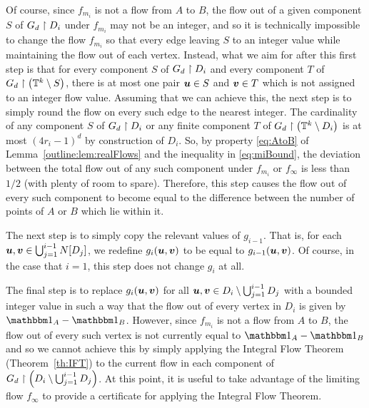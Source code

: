 \documentclass[12pt,a4paper]{amsart}
\numberwithin{equation}{section}
\theoremstyle{definition}
\begin{document}
Of course, since $f_{m_i}$ is not a flow from $A$ to $B$, the flow out of a given component $S$ of $G_d\upharpoonright D_i$ under $f_{m_i}$ may not be an integer, and so it is technically impossible to change the flow $f_{m_i}$ so that every edge leaving $S$ to an integer value while maintaining the flow out of each vertex. Instead, what we aim for after this first step is that for every component $S$ of $G_d\upharpoonright D_i$ and every component $T$ of $G_d\upharpoonright \left(\mathbb{T}^k\setminus S\right)$, there is at most one pair $\boldsymbol{u}\in S$ and $\boldsymbol{v}\in T$ which is not assigned to an integer flow value. Assuming that we can achieve this, the next step is to simply round the flow on every such edge to the nearest integer. The cardinality of any component $S$ of $G_d\upharpoonright D_i$ or any finite component $T$ of $G_d\upharpoonright \left(\mathbb{T}^k\setminus D_i\right)$ is at most $(4r_i-1)^d$ by construction of $D_i$. So, by property \eqref{eq:AtoB} of Lemma~\ref{outline:lem:realFlows} and the inequality in \eqref{eq:miBound}, the deviation between the total flow out of any such component under $f_{m_i}$ or $f_\infty$ is less than $1/2$ (with plenty of room to spare). Therefore, this step causes the flow out of every such component to become equal to the difference between the number of points of $A$ or $B$ which lie within it.

The next step is to simply copy the relevant values of $g_{i-1}$. That is, for each $\boldsymbol{u},\boldsymbol{v}\in \bigcup_{j=1}^{i-1}N[D_j]$, we redefine $g_{i}(\boldsymbol{u},\boldsymbol{v})$ to be equal to $g_{i-1}(\boldsymbol{u},\boldsymbol{v})$. Of course, in the case that $i=1$, this step does not change $g_i$ at all. 

The final step is to replace $g_{i}(\boldsymbol{u},\boldsymbol{v})$ for all $\boldsymbol{u},\boldsymbol{v}\in D_i\setminus \bigcup_{j=1}^{i-1}D_j$ with a bounded integer value in such a way that the flow out of every vertex in $D_i$ is given by $\ind_A-\ind_B$. However, since $f_{m_i}$ is not a flow from $A$ to $B$, the flow out of every such vertex is not currently equal to $\ind_A-\ind_B$ and so we cannot achieve this by simply applying the Integral Flow Theorem (Theorem~\ref{th:IFT}) to the current flow in each component of $G_d\upharpoonright \left(D_i\setminus \bigcup_{j=1}^{i-1}D_j\right)$. At this point, it is useful to take advantage of the limiting flow $f_\infty$ to provide a certificate for applying the Integral Flow Theorem. 
\end{document}
